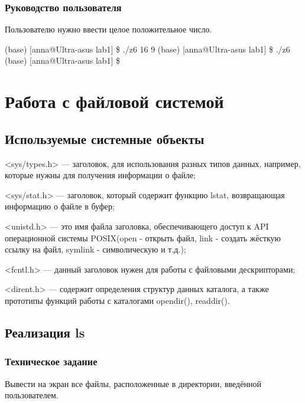 \documentclass[a4paper,12pt]{extarticle}
\begin{document}
\subsubsection{Руководство пользователя}
Пользователю нужно ввести целое положительное число.

(base) [anna@Ultra-asus lab1] \$ ./z6  16  9 \newline
(base) [anna@Ultra-asus lab1] \$ ./z6 \newline
(base) [anna@Ultra-asus lab1] \$\newline

\newpage

\section{Работа с файловой системой}
\subsection{Используемые системные объекты}

<sys/types.h> --- заголовок, для использования разных типов данных, например, которые нужны для получения информации о файле;

<sys/stat.h> --- заголовок, который содержит функцию lstat, возвращающая информацию о файле в буфер;

<unistd.h> --- это имя файла заголовка, обеспечивающего доступ к API операционной системы POSIX(open - открыть файл, link - создать жёсткую ссылку на файл, symlink - символическую и т.д.);

<fcntl.h> --- данный заголовок нужен для работы с файловыми дескрипторами;

<dirent.h> --- содержит определения структур данных каталога, а также прототипы функций работы с каталогами opendir(), readdir().



\subsection{Реализация ls}
\subsubsection{Техническое задание}
Вывести   на   экран   все   файлы,   расположенные в директории,   введённой пользователем.
\end{document}
